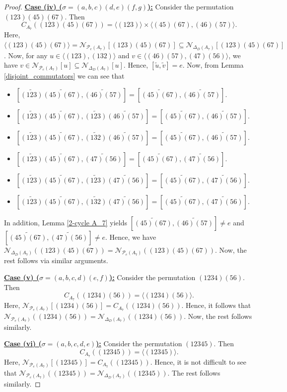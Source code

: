 \documentclass[10pt,a4paper]{amsart}
\begin{document}
\begin{proof}
\vspace{.3cm}
\noindent\underline{\bf{Case (iv) ($\sigma=(a,b,c)(d,e)(f,g)$):}} Consider the permutation $(123)(45)(67)$. Then \[C_{A_7}((123)(45)(67))=\langle(123)\rangle\times\langle(45)(67),(46)(57)\rangle.\] Here, $\langle(123)(45)(67)\rangle=\mathcal{N}_{\mathcal{P}_e(A_7)}[(123)(45)(67)]\subseteq\mathcal{N}_{\Delta_D(A_7)}[(123)(45)(67)]$. Now, for any $u\in \langle(123),(132)\rangle$ and $v\in \langle(46)(57),(47)(56)\rangle$, we have $v\in\mathcal{N}_{\mathcal{P}_e(A_7)}[u]\subseteq\mathcal{N}_{\Delta_D(A_7)}[u]$. Hence, $[\tilde{u},\tilde{v}]=e$. Now, from Lemma \ref{disjoint_commutators} we can see that 
\begin{itemize}
    \item $[\tilde{(123)}\tilde{(45)(67)},\tilde{(46)(57)}]=[\tilde{(45)(67)},\tilde{(46)(57)}].$
    \item $[\tilde{(123)}\tilde{(45)(67)},\tilde{(123)}\tilde{(46)(57)}]=[\tilde{(45)(67)},\tilde{(46)(57)}]$.
    \item $[\tilde{(123)}\tilde{(45)(67)},\tilde{(132)}\tilde{(46)(57)}]=[\tilde{(45)(67)},\tilde{(46)(57)}].$
    \item $[\tilde{(123)}\tilde{(45)(67)},\tilde{(47)(56)}]=[\tilde{(45)(67)},\tilde{(47)(56)}]$.
    \item $[\tilde{(123)}\tilde{(45)(67)},\tilde{(123)}\tilde{(47)(56)}]=[\tilde{(45)(67)},\tilde{(47)(56)}]$.
    \item $[\tilde{(123)}\tilde{(45)(67)},\tilde{(132)}\tilde{(47)(56)}]=[\tilde{(45)(67)},\tilde{(47)(56)}]$.
\end{itemize}
In addition, Lemma \ref{2-cycle A_7} yields $[\tilde{(45)(67)},\tilde{(46)(57)}]\neq e$ and $[\tilde{(45)(67)},\tilde{(47)(56)}]\neq e$. Hence, we have $\mathcal{N}_{\Delta_D(A_7)}((123)(45)(67))=\mathcal{N}_{\mathcal{P}_e(A_7)}((123)(45)(67))$. Now, the rest follows via similar arguments.

\vspace{.3cm}
\noindent\underline{\bf{Case (v) ($\sigma=(a,b,c,d)(e,f)$):}} Consider the permutation $(1234)(56)$. Then \[C_{A_7}((1234)(56))=\langle(1234)(56)\rangle.\] Here, $\mathcal{N}_{\mathcal{P}_e(A_7)}[(1234)(56)]=C_{A_7}((1234)(56))$. Hence, it follows that $\mathcal{N}_{\mathcal{P}_e(A_7)}((1234)(56))=\mathcal{N}_{\Delta_D(A_7)}((1234)(56))$. Now, the rest follows similarly.

\vspace{.3cm}
\noindent\underline{\bf{Case (vi) ($\sigma=(a,b,c,d,e)$):}} Consider the permutation $(12345)$. Then \[C_{A_7}((12345))=\langle(12345)\rangle.\] Here, $\mathcal{N}_{\mathcal{P}_e(A_7)}[(12345)]=C_{A_7}((12345))$. Hence, it is not difficult to see that $\mathcal{N}_{\mathcal{P}_e(A_7)}((12345))=\mathcal{N}_{\Delta_D(A_7)}((12345))$. The rest follows similarly.


\end{proof}
\end{document}
